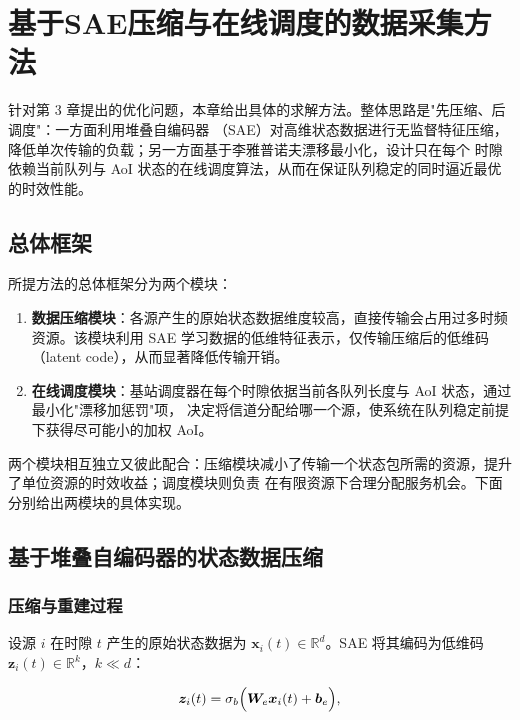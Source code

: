 
\chapter{基于SAE压缩与在线调度的数据采集方法}

针对第 3 章提出的优化问题，本章给出具体的求解方法。整体思路是"先压缩、后调度"：一方面利用堆叠自编码器
（SAE）对高维状态数据进行无监督特征压缩，降低单次传输的负载；另一方面基于李雅普诺夫漂移最小化，设计只在每个
时隙依赖当前队列与 AoI 状态的在线调度算法，从而在保证队列稳定的同时逼近最优的时效性能。

\section{总体框架}

所提方法的总体框架分为两个模块：
\begin{enumerate}
  \item \textbf{数据压缩模块}：各源产生的原始状态数据维度较高，直接传输会占用过多时频资源。该模块利用
        SAE 学习数据的低维特征表示，仅传输压缩后的低维码（latent code），从而显著降低传输开销。
  \item \textbf{在线调度模块}：基站调度器在每个时隙依据当前各队列长度与 AoI 状态，通过最小化"漂移加惩罚"项，
        决定将信道分配给哪一个源，使系统在队列稳定前提下获得尽可能小的加权 AoI。
\end{enumerate}

两个模块相互独立又彼此配合：压缩模块减小了传输一个状态包所需的资源，提升了单位资源的时效收益；调度模块则负责
在有限资源下合理分配服务机会。下面分别给出两模块的具体实现。

\section{基于堆叠自编码器的状态数据压缩}

\subsection{压缩与重建过程}

设源 $i$ 在时隙 $t$ 产生的原始状态数据为 $\boldsymbol{x}_i(t)\in\mathbb{R}^{d}$。SAE 将其编码为低维码
$\boldsymbol{z}_i(t)\in\mathbb{R}^{k}$，$k\ll d$：

\begin{equation}\label{eq:code}
  \boldsymbol{z}_i(t) =
  \sigma_b\Bigl(\boldsymbol{W}_{e}\boldsymbol{x}_i(t) + \boldsymbol{b}_{e}\Bigr),
\end{equation}

